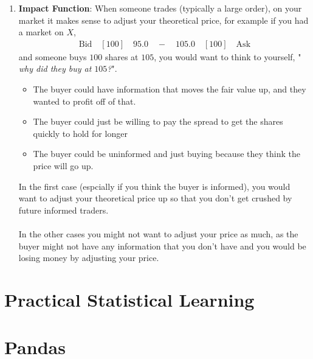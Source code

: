 \documentclass[letterpaper, 11pt]{article}
\newcommand{\1}{\mathds{1}}	%
\theoremstyle{definition}
\begin{document}
\begin{enumerate}
\begin{itemize}
    \end{itemize}
    \item \textbf{Impact Function}: When someone trades (typically a large order), on your market 
    it makes sense to adjust your theoretical price, for example if you had a market on $X$,
    \begin{align}
        \text{Bid} \quad  [100] \quad 95.0 \quad - \quad 105.0 \quad [100] \quad \text{Ask} 
    \end{align}
    and someone buys $100$ shares at $105$, you would want to think to yourself, "
    \textit{why did they buy at $105$?}".
    \begin{itemize}
        \item The buyer could have information that moves the fair value up, and they wanted 
        to profit off of that. 
        \item The buyer could just be willing to pay the spread to get the shares quickly to hold for longer
        \item The buyer could be uninformed and just buying because they think the price will go up.
    \end{itemize}
    In the first case (espcially if you think the buyer is informed), you would want to adjust your 
    theoretical price up so that you don't get crushed by future informed traders. \\ \\
    In the other cases you might not want to adjust your price as much, as the buyer might not have
    any information that you don't have and you would be losing money by adjusting your price.
\end{enumerate}

\section{Practical Statistical Learning}

\section{Pandas}
\end{document}
